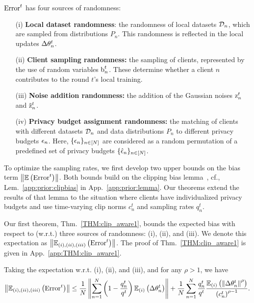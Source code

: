 $\text{Error}^t$ has four sources of randomness: 
\begin{itemize}
\item[(i)] \textbf{Local dataset randomness}: the randomness of local datasets $\mathcal{D}_n$, which are sampled from distributions $P_n$.  This randomness is reflected in the local updates $\Delta {\theta}_n^t$.
\item[(ii)] \textbf{Client sampling randomness:} the sampling of clients, represented by the use of random variables ${\textnormal{b}}_n^t$.  These determine whether a client $n$ contributes to the round $t$'s local training. 
\item[(iii)] \textbf{Noise addition randomness:} the addition of the Gaussian noises ${\textnormal{z}}_n^t$ and  $\tilde{{\textnormal{z}}}_n^t$.
\item[(iv)] \textbf{Privacy budget assignment randomness:}  the matching of clients with different datasets $\mathcal{D}_n$ and data distributions $P_n$ to different privacy budgets ${\epsilon}_{n}$. Here, $\{{\epsilon}_{n}\}_{n\in [N]}$ are considered as a random permutation of a predefined set of privacy budgets $\{\hat{{\epsilon}}_n\}_{n\in [N]}$.
\end{itemize}
 
To optimize the sampling rates, we first develop two upper bounds on the bias term $\left\| \mathbb{E}\left({\text{Error}^t}\right)\right\|$. Both bounds build on the clipping bias lemma~\citep{das2023beyond}, cf., Lem.~\ref{app:prior:clipbias} in App.~\ref{app:prior:lemma}. Our theorems extend the results of that lemma to the situation where clients have individualized privacy budgets and use time-varying clip norms $c_n^t$ and sampling rates $q_n^t$.

Our first theorem, Thm.~\ref{THM:clip_aware1}, bounds the expected bias with respect to (w.r.t.) three sources of randomness: (i), (ii), and (iii). We denote this expectation as $\left\| \mathbb{E}_{(i), (ii), (iii)}\left({\text{Error}^t}\right)\right\|$.  The proof of Thm.~\ref{THM:clip_aware1} is given in App.~\ref{app:THM:clip_aware1}. 
 
\begin{theorem}\label{THM:clip_aware1} Taking the expectation w.r.t. (i), (ii), and (iii), and for any $\rho>1$, we have
\begin{align}\label{eq:THM:clip_aware1:1}
\left\| \mathbb{E}_{(i), (ii), (iii)}\left({\text{Error}^t}\right)\right\| \leq \frac{1}{N} \left\| \sum_{n=1}^N \left(1 - \frac{q_n^t}{q^t}\right)\mathbb{E}_{(i)}\left({{\Delta {\theta}_n^t}}\right)\right\| + \frac{1}{N}\sum_{n=1}^N \frac{q_n^t}{q^t}  \frac{\mathbb{E}_{(i)}\left({\left\|{\Delta {\theta}_n^t}\right\|^{\rho}}\right)}{\left(c_n^t\right)^{\rho-1}}.
\end{align}
\end{theorem}

